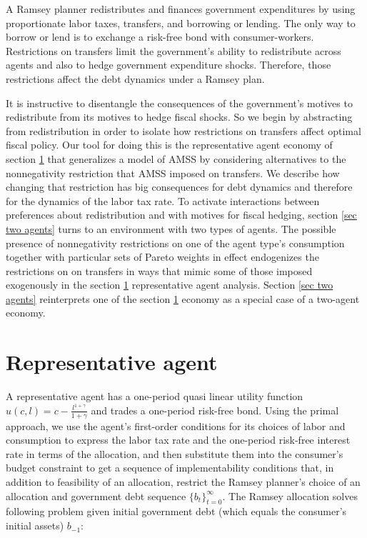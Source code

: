 \documentclass[thmsb,11pt]{article}
\begin{document}
 A Ramsey planner redistributes and finances  government expenditures by  using proportionate labor taxes, transfers, and borrowing or lending.
 The only way to borrow or lend is to exchange a risk-free bond with consumer-workers.   Restrictions  on transfers limit the government's
  ability to redistribute across agents and also  to hedge
 government expenditure shocks. Therefore, those restrictions  affect the debt dynamics under a Ramsey plan.

 It is instructive to disentangle the consequences of the government's motives to redistribute from its motives to hedge fiscal shocks.  So
 we begin by abstracting from  redistribution in order to isolate how restrictions on transfers affect optimal fiscal policy.
 Our tool for doing this is the representative agent economy of section \ref{sec rep agent} that generalizes a model of  AMSS by considering
 alternatives to
 the nonnegativity restriction that AMSS imposed on transfers. We describe how changing that restriction has big consequences for debt dynamics and therefore for the dynamics
  of the labor tax rate.  To activate interactions between  preferences about redistribution and with motives for fiscal hedging, section \ref{sec two agents} turns  to an environment with two types of agents.  The possible presence of nonnegativity
 restrictions on one of the agent type's consumption together with particular sets of Pareto weights in effect  endogenizes the  restrictions on
on transfers in ways that  mimic some of those imposed  exogenously in the section \ref{sec rep agent} representative agent analysis.
 Section \ref{sec two agents}
reinterprets one of the section \ref{sec rep agent} economy as a special case of a two-agent economy.

\section{Representative agent}
\label{sec rep agent}
 A representative agent  has a one-period quasi linear utility function  $u(c,l)=c-\frac{l^{1+\gamma}}{1+\gamma}$ and
 trades   a one-period risk-free bond. Using the primal approach, we use the agent's first-order conditions for
 its choices of labor and consumption to express the labor  tax rate and the one-period risk-free interest  rate in terms of the
  allocation, and then substitute them  into  the
 consumer's budget constraint to get a sequence of implementability conditions that, in addition to feasibility of an allocation,  restrict the
  Ramsey planner's choice of an allocation and government debt sequence $\{b_t\}_{t=0}^\infty$.  The Ramsey allocation
  solves  following problem given  initial government debt (which equals the consumer's  initial assets) $b_{-1}$:
\end{document}
